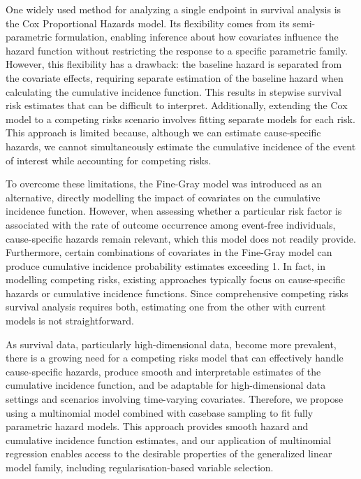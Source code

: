 \documentclass[AMA,Times1COL]{WileyNJDv5} %
\begin{document}
One widely used method for analyzing a single endpoint in survival analysis is the Cox Proportional Hazards model. Its flexibility comes from its semi-parametric formulation, enabling inference about how covariates influence the hazard function without restricting the response to a specific parametric family. However, this flexibility has a drawback: the baseline hazard is separated from the covariate effects, requiring separate estimation of the baseline hazard when calculating the cumulative incidence function. This results in stepwise survival risk estimates that can be difficult to interpret. Additionally, extending the Cox model to a competing risks scenario involves fitting separate models for each risk. This approach is limited because, although we can estimate cause-specific hazards, we cannot simultaneously estimate the cumulative incidence of the event of interest while accounting for competing risks.

To overcome these limitations, the Fine-Gray model was introduced as an alternative, directly modelling the impact of covariates on the cumulative incidence function. However, when assessing whether a particular risk factor is associated with the rate of outcome occurrence among event-free individuals, cause-specific hazards remain relevant, which this model does not readily provide. Furthermore, certain combinations of covariates in the Fine-Gray model can produce cumulative incidence probability estimates exceeding 1. In fact, in modelling competing risks, existing approaches typically focus on cause-specific hazards or cumulative incidence functions. Since comprehensive competing risks survival analysis requires both, estimating one from the other with current models is not straightforward.

As survival data, particularly high-dimensional data, become more prevalent, there is a growing need for a competing risks model that can effectively handle cause-specific hazards, produce smooth and interpretable estimates of the cumulative incidence function, and be adaptable for high-dimensional data settings and scenarios involving time-varying covariates. Therefore, we propose using a multinomial model combined with casebase sampling to fit fully parametric hazard models. This approach provides smooth hazard and cumulative incidence function estimates, and our application of multinomial regression enables access to the desirable properties of the generalized linear model family, including regularisation-based variable selection.
\end{document}
